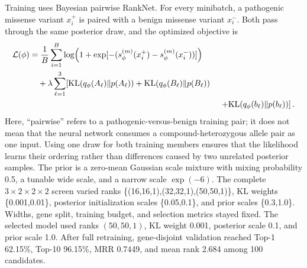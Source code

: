 \documentclass[11pt]{article}
\begin{document}
Training uses Bayesian pairwise RankNet. For every minibatch, a pathogenic missense variant $x_i^+$ is paired with a benign missense variant $x_i^-$. Both pass through the same posterior draw, and the optimized objective is
\begin{equation}
\begin{aligned}
\mathcal{L}(\phi)
&=\frac{1}{B}\sum_{i=1}^{B}\log\!\left(1+\exp[-(s_\phi^{(m)}(x_i^+)-s_\phi^{(m)}(x_i^-))]\right)\\
&\quad+\lambda\sum_{\ell=1}^{3}\!\left[
\mathrm{KL}(q_\phi(A_\ell)\Vert p(A_\ell))+
\mathrm{KL}(q_\phi(B_\ell)\Vert p(B_\ell))\right.\\
&\hspace{8.1cm}\left.+\mathrm{KL}(q_\phi(b_\ell)\Vert p(b_\ell))\right].
\end{aligned}
\label{eq:augmented-ranknet}
\end{equation}
Here, ``pairwise'' refers to a pathogenic-versus-benign training pair; it does not mean that the neural network consumes a compound-heterozygous allele pair as one input. Using one draw for both training members ensures that the likelihood learns their ordering rather than differences caused by two unrelated posterior samples. The prior is a zero-mean Gaussian scale mixture with mixing probability 0.5, a tunable wide scale, and a narrow scale $\exp(-6)$. The complete $3\times2\times2\times2$ screen varied ranks \{(16,16,1),(32,32,1),(50,50,1)\}, KL weights \{0.001,0.01\}, posterior initialization scales \{0.05,0.1\}, and prior scales \{0.3,1.0\}. Widths, gene split, training budget, and selection metrics stayed fixed. The selected model used ranks $(50,50,1)$, KL weight 0.001, posterior scale 0.1, and prior scale 1.0. After full retraining, gene-disjoint validation reached Top-1 62.15\%, Top-10 96.15\%, MRR 0.7449, and mean rank 2.684 among 100 candidates.
\end{document}
